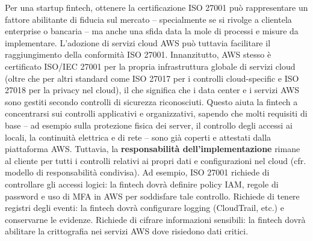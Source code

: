 \documentclass[a4paper,12pt]{report}
\begin{document}
Per una startup fintech, ottenere la certificazione ISO 27001 può rappresentare un fattore abilitante di fiducia sul mercato – specialmente se si rivolge a clientela enterprise o bancaria – ma anche una sfida data la mole di processi e misure da implementare. L’adozione di servizi cloud AWS può tuttavia facilitare il raggiungimento della conformità ISO 27001. Innanzitutto, AWS stesso è certificato ISO/IEC 27001 per la propria infrastruttura globale di servizi cloud (oltre che per altri standard come ISO 27017 per i controlli cloud-specific e ISO 27018 per la privacy nel cloud), il che significa che i data center e i servizi AWS sono gestiti secondo controlli di sicurezza riconosciuti. Questo aiuta la fintech a concentrarsi sui controlli applicativi e organizzativi, sapendo che molti requisiti di base – ad esempio sulla protezione fisica dei server, il controllo degli accessi ai locali, la continuità elettrica e di rete – sono già coperti e attestati dalla piattaforma AWS. Tuttavia, la \textbf{responsabilità dell’implementazione} rimane al cliente per tutti i controlli relativi ai propri dati e configurazioni nel cloud (cfr. modello di responsabilità condivisa). Ad esempio, ISO 27001 richiede di controllare gli accessi logici: la fintech dovrà definire policy IAM, regole di password e uso di MFA in AWS per soddisfare tale controllo. Richiede di tenere registri degli eventi: la fintech dovrà configurare logging (CloudTrail, etc.) e conservarne le evidenze. Richiede di cifrare informazioni sensibili: la fintech dovrà abilitare la crittografia nei servizi AWS dove risiedono dati critici.
\end{document}

